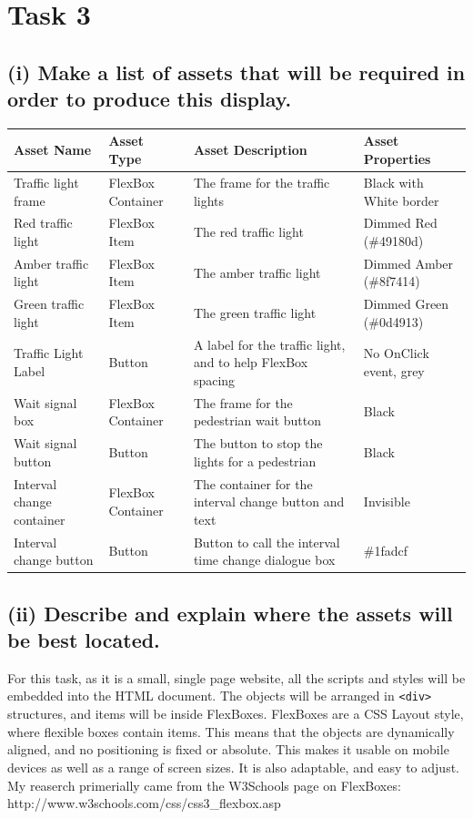 \documentclass[a4paper]{article}
\begin{document}
\section{Task 3}
\subsection{(i) Make a list of assets that will be required in order to produce this display.}
\begin{center}
\begin{tabular}{ | m{9em} | m{10em} | m{15em} | m{8em} | }
  \hline
  Asset Name & Asset Type & Asset Description & Asset Properties	\\ [0.5ex] 
  \hline \hline	
  Traffic light frame & FlexBox Container & The frame for the traffic lights & Black with White border \\
  \hline
  Red traffic light & FlexBox Item & The red traffic light & Dimmed Red (\#49180d) \\
  \hline
  Amber traffic light & FlexBox Item & The amber traffic light & Dimmed Amber (\#8f7414) \\
	\hline
	Green traffic light & FlexBox Item & The green traffic light & Dimmed Green (\#0d4913) \\
	\hline
	Traffic Light Label & Button & A label for the traffic light, and to help FlexBox spacing & No OnClick event, grey \\
	\hline
	Wait signal box & FlexBox Container & The frame for the pedestrian wait button & Black \\
	\hline
	Wait signal button & Button & The button to stop the lights for a pedestrian & Black \\
	\hline
	Interval change container & FlexBox Container & The container for the interval change button and text & Invisible \\
	\hline
	Interval change button & Button & Button to call the interval time change dialogue box & \#1fadcf \\
	\hline
\end{tabular}
\end{center}
\subsection{(ii) Describe and explain where the assets will be best located.}
For this task, as it is a small, single page website, all the scripts and styles will be embedded into the HTML document. The objects will be arranged in \verb|<div>| structures, and items will be inside FlexBoxes.
FlexBoxes are a CSS Layout style, where flexible boxes contain items. This means that the objects are dynamically aligned, and no positioning is fixed or absolute. This makes it usable on mobile devices as well as a range of screen sizes. It is also adaptable, and easy to adjust. My reaserch primerially came from the W3Schools page on FlexBoxes: http://www.w3schools.com/css/css3_flexbox.asp
\end{document}
